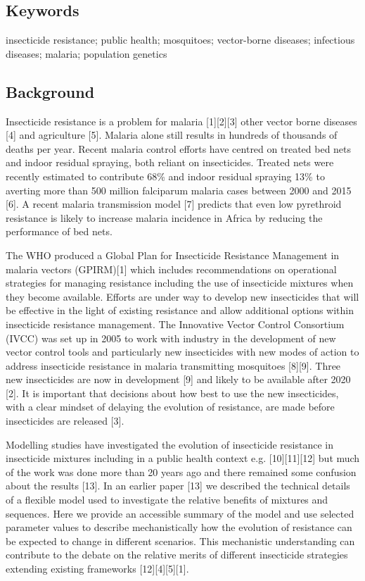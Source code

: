 \documentclass[11pt,]{article}
\begin{document}
\subsection{Keywords}\label{keywords}

insecticide resistance; public health; mosquitoes; vector-borne
diseases; infectious diseases; malaria; population genetics

\subsection{Background}\label{background-1}

Insecticide resistance is a problem for malaria {[}1{]}{[}2{]}{[}3{]}
other vector borne diseases {[}4{]} and agriculture {[}5{]}. Malaria
alone still results in hundreds of thousands of deaths per year. Recent
malaria control efforts have centred on treated bed nets and indoor
residual spraying, both reliant on insecticides. Treated nets were
recently estimated to contribute 68\% and indoor residual spraying 13\%
to averting more than 500 million falciparum malaria cases between 2000
and 2015 {[}6{]}. A recent malaria transmission model {[}7{]} predicts
that even low pyrethroid resistance is likely to increase malaria
incidence in Africa by reducing the performance of bed nets.

The WHO produced a Global Plan for Insecticide Resistance Management in
malaria vectors (GPIRM){[}1{]} which includes recommendations on
operational strategies for managing resistance including the use of
insecticide mixtures when they become available. Efforts are under way
to develop new insecticides that will be effective in the light of
existing resistance and allow additional options within insecticide
resistance management. The Innovative Vector Control Consortium (IVCC)
was set up in 2005 to work with industry in the development of new
vector control tools and particularly new insecticides with new modes of
action to address insecticide resistance in malaria transmitting
mosquitoes {[}8{]}{[}9{]}. Three new insecticides are now in development
{[}9{]} and likely to be available after 2020 {[}2{]}. It is important
that decisions about how best to use the new insecticides, with a clear
mindset of delaying the evolution of resistance, are made before
insecticides are released {[}3{]}.

Modelling studies have investigated the evolution of insecticide
resistance in insecticide mixtures including in a public health context
e.g. {[}10{]}{[}11{]}{[}12{]} but much of the work was done more than 20
years ago and there remained some confusion about the results {[}13{]}.
In an earlier paper {[}13{]} we described the technical details of a
flexible model used to investigate the relative benefits of mixtures and
sequences. Here we provide an accessible summary of the model and use
selected parameter values to describe mechanistically how the evolution
of resistance can be expected to change in different scenarios. This
mechanistic understanding can contribute to the debate on the relative
merits of different insecticide strategies extending existing frameworks
{[}12{]}{[}4{]}{[}5{]}{[}1{]}.
\end{document}
